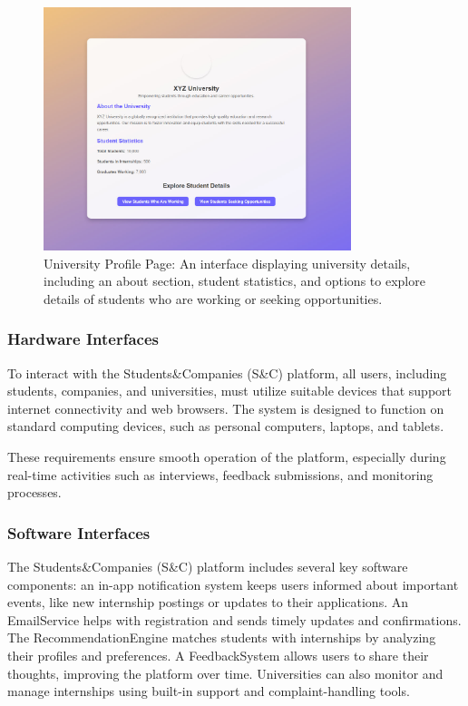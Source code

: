 \begin{figure}[H]
\centering
\includegraphics[width=0.8\textwidth]{Images/13.jpg}
\caption{\label{fig:metamodel13}University Profile Page: An interface displaying university details, including an about section, student statistics, and options to explore details of students who are working or seeking opportunities.}
\end{figure}


\subsubsection{Hardware Interfaces}

To interact with the Students\&Companies (S\&C) platform, all users, including students, companies, and universities, must utilize suitable devices that support internet connectivity and web browsers. The system is designed to function on standard computing devices, such as personal computers, laptops, and tablets.

These requirements ensure smooth operation of the platform, especially during real-time activities such as interviews, feedback submissions, and monitoring processes.

\subsubsection{Software Interfaces}

The Students\&Companies (S\&C) platform includes several key software components: an in-app notification system keeps users informed about important events, like new internship postings or updates to their applications. An EmailService helps with registration and sends timely updates and confirmations. The RecommendationEngine matches students with internships by analyzing their profiles and preferences. A FeedbackSystem allows users to share their thoughts, improving the platform over time. Universities can also monitor and manage internships using built-in support and complaint-handling tools.

